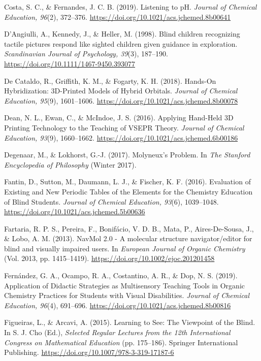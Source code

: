 \documentclass[11.5pt]{sig-alternate} %
\begin{document}
Costa, S. C., \& Fernandes, J. C. B. (2019). Listening to pH. \textit{Journal of Chemical Education, 96}(2), 372–376. \url{https://doi.org/10.1021/acs.jchemed.8b00641}

D’Angiulli, A., Kennedy, J., \& Heller, M. (1998). Blind children recognizing tactile pictures respond like sighted children given guidance in exploration. \textit{Scandinavian Journal of Psychology, 39}(3), 187–190. \url{https://doi.org/10.1111/1467-9450.393077}

De Cataldo, R., Griffith, K. M., \& Fogarty, K. H. (2018). Hands-On Hybridization: 3D-Printed Models of Hybrid Orbitals. \textit{Journal of Chemical Education, 95}(9), 1601–1606. \url{https://doi.org/10.1021/acs.jchemed.8b00078}

Dean, N. L., Ewan, C., \& McIndoe, J. S. (2016). Applying Hand-Held 3D Printing Technology to the Teaching of VSEPR Theory. \textit{Journal of Chemical Education, 93}(9), 1660–1662. \url{https://doi.org/10.1021/acs.jchemed.6b00186}

Degenaar, M., \& Lokhorst, G.-J. (2017). Molyneux’s Problem. In \textit{The Stanford Encyclopedia of Philosophy} (Winter 2017).

Fantin, D., Sutton, M., Daumann, L. J., \& Fischer, K. F. (2016). Evaluation of Existing and New Periodic Tables of the Elements for the Chemistry Education of Blind Students. \textit{Journal of Chemical Education, 93}(6), 1039–1048. \url{https://doi.org/10.1021/acs.jchemed.5b00636}

Fartaria, R. P. S., Pereira, F., Bonifácio, V. D. B., Mata, P., Aires-De-Sousa, J., \& Lobo, A. M. (2013). NavMol 2.0 - A molecular structure navigator/editor for blind and visually impaired users. In \textit{European Journal of Organic Chemistry} (Vol. 2013, pp. 1415–1419). \url{https://doi.org/10.1002/ejoc.201201458}

Fernández, G. A., Ocampo, R. A., Costantino, A. R., \& Dop, N. S. (2019). Application of Didactic Strategies as Multisensory Teaching Tools in Organic Chemistry Practices for Students with Visual Disabilities. \textit{Journal of Chemical Education, 96}(4), 691–696. \url{https://doi.org/10.1021/acs.jchemed.8b00816}

Figueiras, L., \& Arcavi, A. (2015). Learning to See: The Viewpoint of the Blind. In S. J. Cho (Ed.), \textit{Selected Regular Lectures from the 12th International Congress on Mathematical Education} (pp. 175–186). Springer International Publishing. \url{https://doi.org/10.1007/978-3-319-17187-6}
\end{document}
